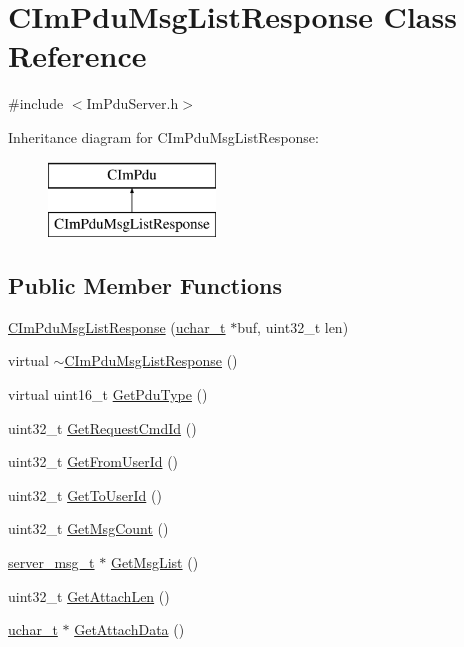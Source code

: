 \hypertarget{class_c_im_pdu_msg_list_response}{}\section{C\+Im\+Pdu\+Msg\+List\+Response Class Reference}
\label{class_c_im_pdu_msg_list_response}


{\ttfamily \#include $<$Im\+Pdu\+Server.\+h$>$}

Inheritance diagram for C\+Im\+Pdu\+Msg\+List\+Response\+:\begin{figure}[H]
\begin{center}
\leavevmode
\includegraphics[height=2.000000cm]{class_c_im_pdu_msg_list_response}
\end{center}
\end{figure}
\subsection*{Public Member Functions}
\begin{DoxyCompactItemize}
\item 
\hyperlink{class_c_im_pdu_msg_list_response_a554fb5dad333717c3aa8b29e397ba01b}{C\+Im\+Pdu\+Msg\+List\+Response} (\hyperlink{base_2ostype_8h_a124ea0f8f4a23a0a286b5582137f0b8d}{uchar\+\_\+t} $\ast$buf, uint32\+\_\+t len)
\item 
virtual \hyperlink{class_c_im_pdu_msg_list_response_a524fb17aa132a947a29af581cb1d4cf8}{$\sim$\+C\+Im\+Pdu\+Msg\+List\+Response} ()
\item 
virtual uint16\+\_\+t \hyperlink{class_c_im_pdu_msg_list_response_aecbbfda30e38ccc6c3ab9ba57432c521}{Get\+Pdu\+Type} ()
\item 
uint32\+\_\+t \hyperlink{class_c_im_pdu_msg_list_response_a9754c49a4fcc8152006e3f1f9e19c735}{Get\+Request\+Cmd\+Id} ()
\item 
uint32\+\_\+t \hyperlink{class_c_im_pdu_msg_list_response_a3878109ee381cb7b2fcb78281cbc1455}{Get\+From\+User\+Id} ()
\item 
uint32\+\_\+t \hyperlink{class_c_im_pdu_msg_list_response_adeabb6a58d2cb722b90d3233d5944fd8}{Get\+To\+User\+Id} ()
\item 
uint32\+\_\+t \hyperlink{class_c_im_pdu_msg_list_response_aa6a76019ae996ab0031a104898e874f8}{Get\+Msg\+Count} ()
\item 
\hyperlink{structserver__msg__t}{server\+\_\+msg\+\_\+t} $\ast$ \hyperlink{class_c_im_pdu_msg_list_response_aad97b8e8a3ecc7d678af23d316cbe6e0}{Get\+Msg\+List} ()
\item 
uint32\+\_\+t \hyperlink{class_c_im_pdu_msg_list_response_a468c352c974dcd478ef3061ff8ecc9fd}{Get\+Attach\+Len} ()
\item 
\hyperlink{base_2ostype_8h_a124ea0f8f4a23a0a286b5582137f0b8d}{uchar\+\_\+t} $\ast$ \hyperlink{class_c_im_pdu_msg_list_response_a251ce5cff0fd698163663f687f68a6b7}{Get\+Attach\+Data} ()
\end{DoxyCompactItemize}
